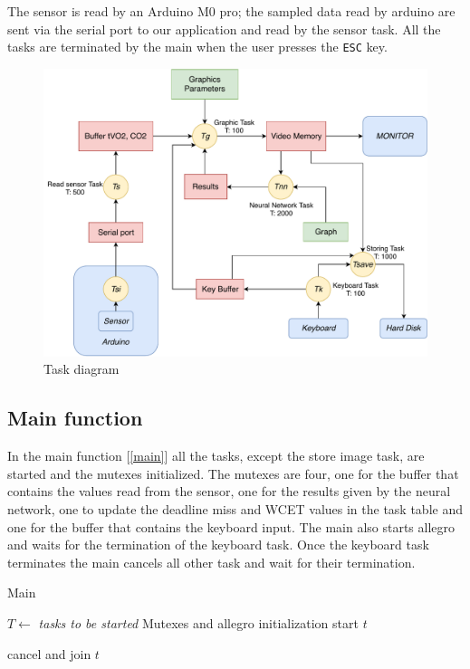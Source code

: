 \documentclass[12pt]{article}
\begin{document}
The sensor is read by an Arduino M0 pro; the sampled data read by arduino
are sent via the serial port to our application and read by the sensor
task. All the tasks are terminated by the main when the user presses the
\texttt{ESC} key.

\begin{figure}[H]
    \includegraphics[width=\textwidth]{diagram.pdf}
    \caption{Task diagram}
    \label{tdiagram}
\end{figure}

\subsection{Main function}
In the main function [\ref{main}] all the tasks, except the store image task,
are started and the mutexes initialized. The mutexes are four, one for the
buffer that contains the values read from the sensor, one for the results
given by the neural network, one to update the deadline miss and WCET values
in the task table and one for the buffer that contains the keyboard input. The
main also starts allegro and waits for the termination of the keyboard task.
Once the keyboard task terminates the main cancels all other task and wait
for their termination.

\begin{algorithm}[H]
\caption{Main}
\label{main}

\begin{algorithmic}
\State $T\gets$ \textit{tasks to be started}
\State Mutexes and allegro initialization
    \State start $t$
\EndFor

\Repeat
{}

    \State cancel and join $t$
\EndFor

\end{algorithmic}
\end{algorithm}
\end{document}
